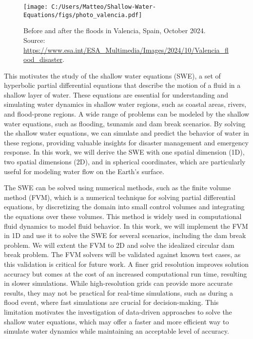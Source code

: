 \begin{figure}
    \centering
    \texttt{[image: C:/Users/Matteo/Shallow-Water-Equations/figs/photo\_valencia.pdf]}
    \caption{Before and after the floods in Valencia, Spain, October 2024.\\
            Source: \url{https://www.esa.int/ESA_Multimedia/Images/2024/10/Valencia_flood_disaster}.}\label{fig:valencia_flood}
\end{figure}

This motivates the study of the shallow water equations (SWE), a set of hyperbolic partial differential equations that describe the motion of a fluid in a shallow layer of water.
These equations are essential for understanding and simulating water dynamics in shallow water regions, such as coastal areas, rivers, and flood-prone regions.
A wide range of problems can be modeled by the shallow water equations, such as flooding, tsunamis and dam break scenarios.
By solving the shallow water equations, we can simulate and predict the behavior of water in these regions, providing valuable insights for disaster management and emergency response.
In this work, we will derive the SWE with one spatial dimension (1D), two spatial dimensions (2D), and in spherical coordinates, which are particularly useful for modeling water flow on the Earth's surface.

The SWE can be solved using numerical methods, such as the finite volume method (FVM), which is a numerical technique for solving partial differential equations, by discretizing the domain into small control volumes and integrating the equations over these volumes.
This method is widely used in computational fluid dynamics to model fluid behavior.
In this work, we will implement the FVM in 1D and use it to solve the SWE for several scenarios, including the dam break problem.
We will extent the FVM to 2D and solve the idealized circular dam break problem.
The FVM solvers will be validated against known test cases, as this validation is critical for future work.
A finer grid resolution improves solution accuracy but comes at the cost of an increased computational run time, resulting in slower simulations.
While high-resolution grids can provide more accurate results, they may not be practical for real-time simulations, such as during a flood event, where fast simulations are crucial for decision-making.
This limitation motivates the investigation of data-driven approaches to solve the shallow water equations, which may offer a faster and more efficient way to simulate water dynamics while maintaining an acceptable level of accuracy.


